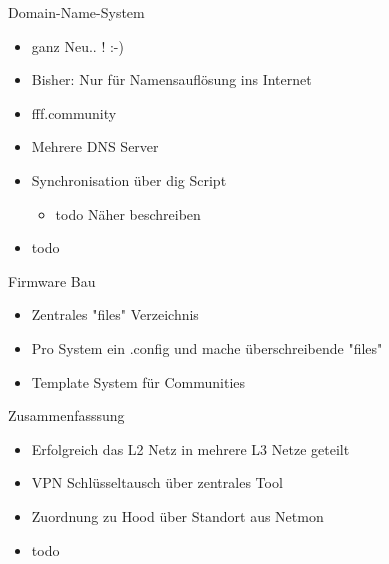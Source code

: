 \begin{frame}{Domain-Name-System}
    \begin{itemize}
        \item ganz Neu.. ! :-)
        \item Bisher: Nur für Namensauflösung ins Internet
        \item fff.community
        \item Mehrere DNS Server
        \item Synchronisation über dig Script
        \begin{itemize}
            \item todo Näher beschreiben
        \end{itemize}
        \item todo
    \end{itemize}
\end{frame}

\begin{frame}{Firmware Bau}
    \begin{itemize}
        \item Zentrales "files" Verzeichnis
        \item Pro System ein .config und mache überschreibende "files"
        \item Template System für Communities
    \end{itemize}
\end{frame}

\begin{frame}{Zusammenfasssung}
    \begin{itemize}
        \item Erfolgreich das L2 Netz in mehrere L3 Netze geteilt
        \item VPN Schlüsseltausch über zentrales Tool
        \item Zuordnung zu Hood über Standort aus Netmon
        \item todo
    \end{itemize}
\end{frame}
